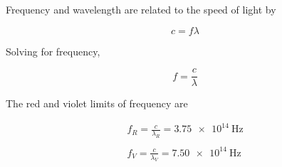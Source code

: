 \documentclass{exam}
\begin{document}
\begin{questions}
\begin{solution}
Frequency and wavelength are related to the speed of light by

\begin{equation*}
    c = f \lambda
\end{equation*}

Solving for frequency,

\begin{equation*}
    f = \frac{c}{\lambda}
\end{equation*}

The red and violet limits of frequency are

\begin{align*}
    f_R = \frac{c}{\lambda_R} = \SI{3.75e14}{\Hz}\\
    \\
    f_V = \frac{c}{\lambda_V} = \SI{7.50e14}{\Hz}\\
\end{align*}
\end{solution}



\end{questions}
\end{document}
